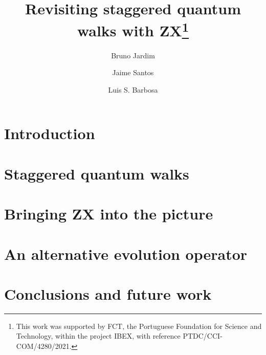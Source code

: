 \documentclass{llncs}
\begin{document}
%

\title{Revisiting staggered quantum walks with ZX\thanks{This work was supported by FCT, the Portuguese Foundation for Science and Technology, within the project IBEX, with reference PTDC/CCI-COM/4280/2021.}}

%
%
\author{Bruno Jardim  \and Jaime Santos \and Luis S. Barbosa }
%
%


\maketitle

\begin{abstract}
    
\end{abstract}

\section{Introduction}
\label{sec:introduction}


\section{Staggered quantum walks}
\label{sec:staggered}

%

\section{Bringing ZX into the picture}
\label{sec:sqw}


\section{An alternative evolution operator}
\label{sec:ev-op}


\section{Conclusions and future work}
\label{sec:conclusion}





\end{document}
